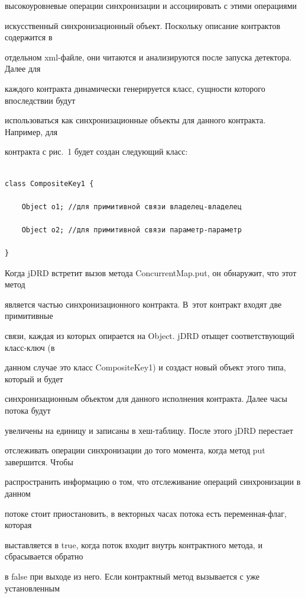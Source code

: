 высокоуровневые операции синхронизации и ассоциировать с этими операциями

искусственный синхронизационный объект. Поскольку описание контрактов содержится в

отдельном xml-фай\-ле, они читаются и анализируются после запуска детектора. Далее для

каждого контракта динамически генерируется класс, сущности которого впоследствии будут

использоваться как синхронизационные объекты для данного контракта. Например, для

контракта с рис.~1 будет создан следующий класс:

  \begin{verbatim}

class CompositeKey1 {

    Object o1; //для примитивной связи владелец-владелец

    Object o2; //для примитивной связи параметр-параметр

}

\end{verbatim}

Когда jDRD встретит вызов метода {\sf ConcurrentMap.put}, он обнаружит, что этот метод

является частью синхронизационного контракта. В~этот контракт входят две примитивные

связи, каждая из которых опирается на {\sf Object}. jDRD \mbox{отыщет} соответствующий класс-ключ (в

данном случае это класс {\sf CompositeKey1}) и создаст новый объект этого типа, который и будет

синхронизационным объектом для данного исполнения контракта. Далее часы потока будут

увеличены на единицу и записаны в хеш-таб\-ли\-цу. После этого jDRD перестает

отслеживать операции синхронизации до того момента, когда метод {\sf put} завершится. Чтобы

распространить информацию о том, что отслеживание операций синхронизации в данном

потоке стоит приостановить, в векторных часах потока есть пе\-ре\-мен\-ная-флаг, которая

выставляется в {\sf true}, когда поток входит внутрь контрактного метода, и сбрасывается обратно

в {\sf false} при выходе из него. Если контрактный метод вызывается с уже установленным

